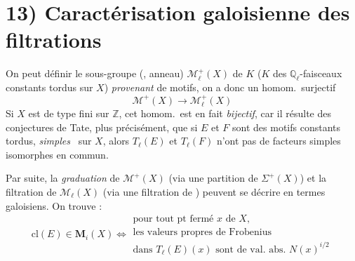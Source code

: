 \documentclass[11pt,a4paper]{article}
\begin{document}
\section{13) Caractérisation galoisienne des filtrations}

On peut définir le sous-groupe (, \struck{\ill{}} anneau) $\mathcal{M}^{+}_{\ell}(X)$ de $K$ ($K$ des \struck{\ill{}} $\mathbb{Q}_{\ell}$-faisceaux constants tordus sur $X$) \emph{provenant} de motifs, on a donc un homom.\ surjectif
\[
  \mathcal{M}^{+}(X) \longrightarrow \mathcal{M}^{+}_{\ell}(X)
\]
Si $X$ est de type fini sur $\mathbb{Z}$, cet homom.\ est en fait \emph{bijectif}, car il résulte des conjectures de Tate, plus précisément, que si $E$ et $F$ sont des motifs constants tordus, \emph{simples} \ sur $X$, alors $T_{\ell}(E)$ et $T_{\ell}(F)$ \struck{\ill{}} n'ont pas de facteurs simples isomorphes en commun.

Par suite, \struck{\ill{}}  la  \emph{graduation} de $\mathcal{M}^{+}(X)$ (via une partition de $\Sigma^{+}(X)$) et la filtration de $\mathcal{M}_{\ell}(X)$ (via une filtration de ) peuvent se décrire en termes galoisiens. On trouve  :
\[
  \mathrm{cl}(E) \in \mathbf{M}_{i}(X) \Longleftrightarrow
  \begin{array}{l}
    \text{pour tout pt fermé }x\text{ de }X\text{,} \\
    \text{les valeurs propres de Frobenius} \\
    \text{dans }T_{\ell}(E)(x)\text{ sont de val.\ abs.\ }N(x)^{i/2}\text{}
  \end{array}
\]
\end{document}
